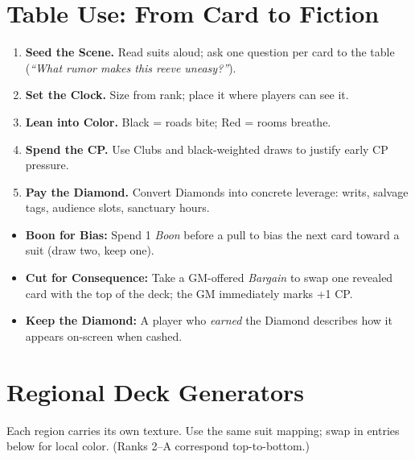 \begin{multicols}{2}
\section{Table Use: From Card to Fiction}
\begin{enumerate}
  \item \textbf{Seed the Scene.} Read suits aloud; ask one question per card to the table (\emph{“What rumor makes this reeve uneasy?”}).
  \item \textbf{Set the Clock.} Size from rank; place it where players can see it.
  \item \textbf{Lean into Color.} Black = roads bite; Red = rooms breathe.
  \item \textbf{Spend the CP.} Use Clubs and black-weighted draws to justify early CP pressure.
  \item \textbf{Pay the Diamond.} Convert Diamonds into concrete leverage: writs, salvage tags, audience slots, sanctuary hours.
\end{enumerate}

\begin{tcolorbox}[colback=blue!5!white,colframe=blue!75!black,title=Player Options with Cards,fonttitle=\bfseries]
\begin{itemize}
  \item \textbf{Boon for Bias:} Spend 1 \emph{Boon} before a pull to bias the next card toward a suit (draw two, keep one).
  \item \textbf{Cut for Consequence:} Take a GM-offered \emph{Bargain} to swap one revealed card with the top of the deck; the GM immediately marks +1 CP.
  \item \textbf{Keep the Diamond:} A player who \emph{earned} the Diamond describes how it appears on-screen when cashed.
\end{itemize}
\end{tcolorbox}

\section{Regional Deck Generators}
Each region carries its own texture. Use the same suit mapping; swap in entries below for local color. (Ranks 2–A correspond top-to-bottom.)


\end{multicols}
